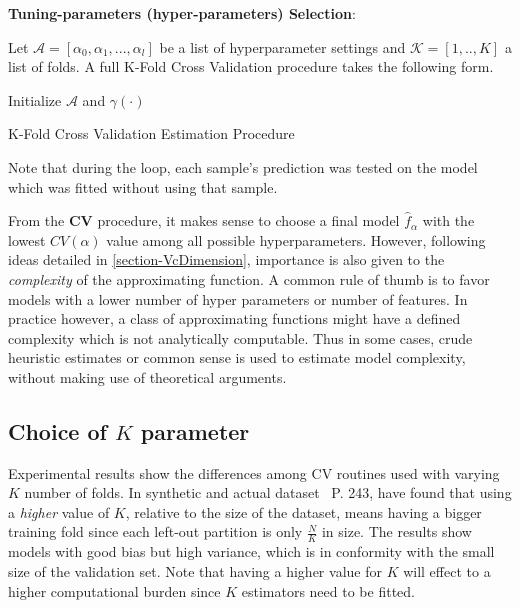 \textbf{Tuning-parameters (hyper-parameters) Selection}:

 Let $\mathcal{A} = [\alpha_0, \alpha_1,..., \alpha_l  ]$ be a list of hyperparameter settings and $\mathcal{K} =[1,..,K]$ a list of folds. A full K-Fold Cross Validation procedure takes the following form.

 \begin{algorithm}%
 \SetAlgoLined
 Initialize $\mathcal{A}$ and $\gamma(\cdot)$\;
 \caption{K-Fold Cross Validation Estimation Procedure}
 \end{algorithm}

Note that during the loop, each sample's prediction was tested on the model which was fitted without using that sample.

From the \textbf{CV} procedure, it makes sense to choose a final model $\hat{f}_\alpha$ with the lowest $CV(\alpha)$ value among all possible hyperparameters. However, following ideas detailed in \cref{section-VcDimension}, importance is also given to the \textit{complexity} of the approximating function. A common rule of thumb is to favor models with a lower number of hyper parameters or number of features. In practice however, a class of approximating functions might have a defined complexity which is not analytically computable. Thus in some cases, crude heuristic estimates or common sense is used to estimate model complexity, without making use of theoretical arguments.


\subsection{Choice of \texorpdfstring{$K$ parameter}{Lg} }
 
 Experimental results show the differences among CV routines used with varying $K$ number of folds. In synthetic and actual dataset~ \textcite{hastie-elemstatslearn} P. 243, have found that using a \textit{higher} value of $K$, relative to the size of the dataset, means having a bigger training fold since each left-out partition is only $\frac{N}{K}$ in size. The results show models with good bias but high variance, which is in conformity with the small size of the validation set. Note that having a higher value for $K$ will effect to a higher computational burden since $K$ estimators need to be fitted.

